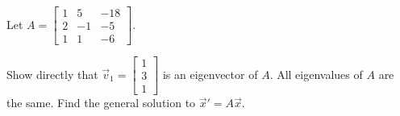 \documentclass{ximera}
\begin{document}
\begin{exercise}
    Let $A=\begin{bmatrix} 1&5&-18\\ 2&-1&-5 \\ 1&1&-6 \end{bmatrix}$. 
    \begin{tasks}
        \task Show directly that $\vec{v}_1=\begin{bmatrix} 1\\3\\1 \end{bmatrix}$ is an eigenvector of $A$.
        \task All eigenvalues of $A$ are the same. Find the general solution to ${\vec{x}}'=A\vec{x}$.
    \end{tasks}
\end{exercise}
\end{document}
